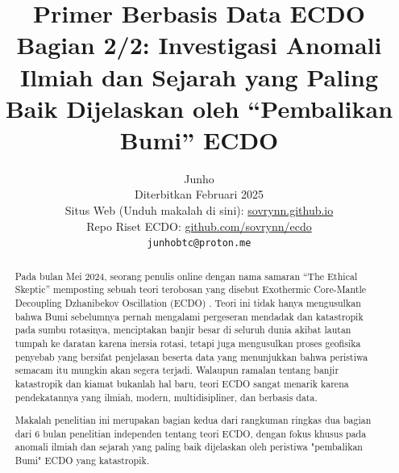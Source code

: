 \documentclass[10pt,twocolumn,letterpaper]{article}
\begin{document}
\title{Primer Berbasis Data ECDO Bagian 2/2: Investigasi Anomali Ilmiah dan Sejarah yang Paling Baik Dijelaskan oleh “Pembalikan Bumi” ECDO}

\author{Junho\\
Diterbitkan Februari 2025\\
Situs Web (Unduh makalah di sini): \href{https://sovrynn.github.io}{sovrynn.github.io}\\
Repo Riset ECDO: \href{https://github.com/sovrynn/ecdo}{github.com/sovrynn/ecdo}\\
{\tt\small junhobtc@proton.me}
}

\maketitle

\begin{abstract}
Pada bulan Mei 2024, seorang penulis online dengan nama samaran “The Ethical Skeptic” \cite{0} memposting sebuah teori terobosan yang disebut Exothermic Core-Mantle Decoupling Dzhanibekov Oscillation (ECDO) \cite{1}. Teori ini tidak hanya mengusulkan bahwa Bumi sebelumnya pernah mengalami pergeseran mendadak dan katastropik pada sumbu rotasinya, menciptakan banjir besar di seluruh dunia akibat lautan tumpah ke daratan karena inersia rotasi, tetapi juga mengusulkan proses geofisika penyebab yang bersifat penjelasan beserta data yang menunjukkan bahwa peristiwa semacam itu mungkin akan segera terjadi. Walaupun ramalan tentang banjir katastropik dan kiamat bukanlah hal baru, teori ECDO sangat menarik karena pendekatannya yang ilmiah, modern, multidisipliner, dan berbasis data.

Makalah penelitian ini merupakan bagian kedua dari rangkuman ringkas dua bagian dari 6 bulan penelitian independen \cite{2,20} tentang teori ECDO, dengan fokus khusus pada anomali ilmiah dan sejarah yang paling baik dijelaskan oleh peristiwa "pembalikan Bumi" ECDO yang katastropik.
\end{abstract}
\end{document}
